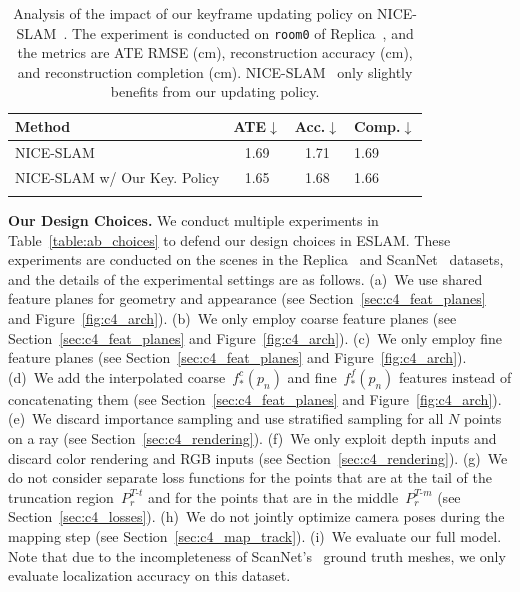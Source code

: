 \begin{table}[t]
    \begin{center}
        \begin{tabular}{l|ccl}
            \Xhline{2\arrayrulewidth}
            \small Method & ATE$\downarrow$ & Acc.$\downarrow$ & Comp.$\downarrow$ \\

            \hline
            \small NICE-SLAM~\citep{zhu2022nice} & 1.69 & 1.71 & 1.69 \\
            \small NICE-SLAM w/ Our Key. Policy & 1.65 & 1.68 & 1.66 \\

            \Xhline{2\arrayrulewidth}
        \end{tabular}
    \end{center}
    \caption{Analysis of the impact of our keyframe updating policy on NICE-SLAM~\citep{zhu2022nice}. The experiment is conducted on \texttt{room0} of Replica~\citep{replica19arxiv}, and the metrics are ATE RMSE (cm), reconstruction accuracy (cm), and reconstruction completion (cm). NICE-SLAM~\citep{zhu2022nice} only slightly benefits from our updating policy.}
    \label{table:ab_key}
\end{table}

\vspace{1ex}
\noindent\textbf{Our Design Choices.} We conduct multiple experiments in Table~\ref{table:ab_choices} to defend our design choices in ESLAM. These experiments are conducted on the scenes in the Replica~\citep{replica19arxiv} and ScanNet~\citep{dai2017scannet} datasets, and the details of the experimental settings are as follows. (a)~We use shared feature planes for geometry and appearance (see Section~\ref{sec:c4_feat_planes} and Figure~\ref{fig:c4_arch}). (b)~We only employ coarse feature planes (see Section~\ref{sec:c4_feat_planes} and Figure~\ref{fig:c4_arch}). (c)~We only employ fine feature planes (see Section~\ref{sec:c4_feat_planes} and Figure~\ref{fig:c4_arch}). (d)~We add the interpolated coarse~$f^{c}_{*}(p_{n})$ and fine~$f^{f}_{*}(p_{n})$ features instead of concatenating them (see Section~\ref{sec:c4_feat_planes} and Figure~\ref{fig:c4_arch}). (e)~We discard importance sampling and use stratified sampling for all $N$ points on a ray (see Section~\ref{sec:c4_rendering}). (f)~We only exploit depth inputs and discard color rendering and RGB inputs (see Section~\ref{sec:c4_rendering}). (g)~We do not consider separate loss functions for the points that are at the tail of the truncation region~$P_{r}^{T\text{-}t}$ and for the points that are in the middle~$P_{r}^{T\text{-}m}$ (see Section~\ref{sec:c4_losses}). (h)~We do not jointly optimize camera poses during the mapping step (see Section~\ref{sec:c4_map_track}). (i)~We evaluate our full model. Note that due to the incompleteness of ScanNet's~\citep{dai2017scannet} ground truth meshes, we only evaluate localization accuracy on this dataset.


